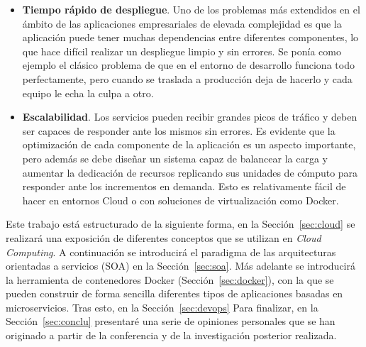 \begin{itemize}
\begin{figure}
\caption{\label{fig:zerodt}Esquema de recuperación ante fallos.}
\end{figure}
Cómo se puede observar en la Figura~\ref{fig:zerodt}, cuando el servidor físico A falla, se desencadena una migración del contenedor virtual al servidor B. Lo que debería ocurrir sin complicaciones en caso de que el volumen de datos compartido por red siga disponible y solo haya ocurrido un problema aislado en la máquina A. En general, el demonio encargado de vigilar el correcto funcionamiento de los nodos se denomina \textit{watchdog} y su funcionamiento se basa en el intercambio periódico de mensajes con los nodos del cluster para intercambiar información del estado del servicio (\textit{keepalive o hearbeat}).
\item \textbf{Tiempo rápido de despliegue}. Uno de los problemas más extendidos en el ámbito de las aplicaciones empresariales de elevada complejidad es que la aplicación puede tener muchas dependencias entre diferentes componentes, lo que hace difícil realizar un despliegue limpio y sin errores. Se ponía como ejemplo el clásico problema de que en el entorno de desarrollo funciona todo perfectamente, pero cuando se traslada a producción deja de hacerlo y cada equipo le echa la culpa a otro.
\item \textbf{Escalabilidad}. Los servicios pueden recibir grandes picos de tráfico y deben ser capaces de responder ante los mismos sin errores. Es evidente que la optimización de cada componente de la aplicación es un aspecto importante, pero además se debe diseñar un sistema capaz de balancear la carga y aumentar la dedicación de recursos replicando sus unidades de cómputo para responder ante los incrementos en demanda. Esto es relativamente fácil de hacer en entornos Cloud o con soluciones de virtualización como Docker.
\end{itemize}

Este trabajo está estructurado de la siguiente forma, en la Sección~\ref{sec:cloud} se realizará una exposición de diferentes conceptos que se utilizan en \emph{Cloud Computing}. A continuación se introducirá el paradigma de las arquitecturas orientadas a servicios (SOA) en la Sección~\ref{sec:soa}. Más adelante se introducirá la herramienta de contenedores Docker (Sección~\ref{sec:docker}), con la que se pueden construir de forma sencilla diferentes tipos de aplicaciones basadas en microservicios. Tras esto, en la Sección~\ref{sec:devops} Para finalizar, en la Sección~\ref{sec:conclu} presentaré una serie de opiniones personales que se han originado a partir de la conferencia y de la investigación posterior realizada.

